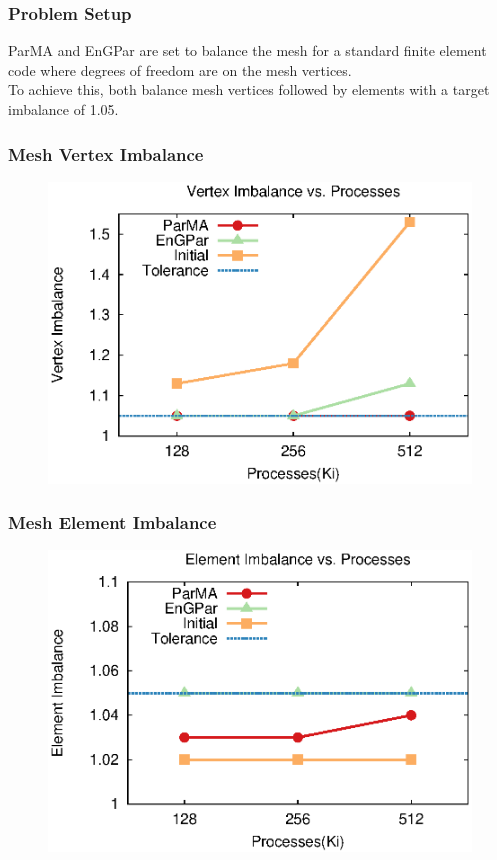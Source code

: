 \documentclass{beamer}
\begin{document}
\begin{frame}
  \frametitle{Problem Setup}
  ParMA and EnGPar are set to balance the mesh for a standard finite element code where degrees of freedom are on the mesh vertices. \\
  \smallskip
  To achieve this, both balance mesh vertices followed by elements with a target imbalance of 1.05. \\
  
\end{frame}

\begin{frame}
  \frametitle{Mesh Vertex Imbalance}
  \begin{figure}
    \centering
    \includegraphics[width=.8\textwidth]{figures/vimb_v_cores.eps}
  \end{figure}  
\end{frame}

\begin{frame}
  \frametitle{Mesh Element Imbalance}
  \begin{figure}
    \centering
    \includegraphics[width=.8\textwidth]{figures/eimb_v_cores.eps}
  \end{figure}  
\end{frame}
\end{document}

